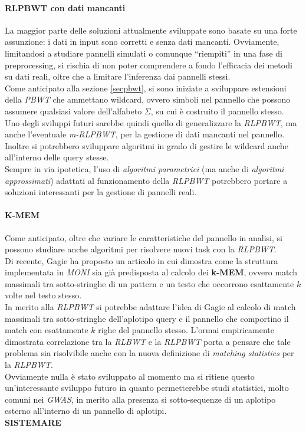 \paragraph{RLPBWT con dati mancanti}
La maggior parte delle soluzioni attualmente sviluppate sono basate su una forte
assunzione: i dati in input sono corretti e senza dati mancanti. Ovviamente,
limitandosi a studiare pannelli simulati o comunque ``riempiti'' in una fase di
preprocessing, si rischia di non poter comprendere a fondo l'efficacia dei
metodi su dati reali, oltre che a limitare l'inferenza dai pannelli stessi.\\
Come anticipato alla sezione \ref{secpbwt}, si sono iniziate a sviluppare
estensioni della \textit{PBWT} che ammettano wildcard, ovvero simboli nel
pannello che possono assumere qualsiasi valore dell'alfabeto $\Sigma$, su cui è
costruito il pannello stesso.\\
Uno degli sviluppi futuri sarebbe quindi quello di generalizzare la
\textit{RLPBWT}, ma anche l'eventuale \textit{m-RLPBWT}, per la gestione di dati
mancanti nel pannello. Inoltre si potrebbero sviluppare algoritmi in grado di
gestire le wildcard anche all'interno delle query stesse.\\
Sempre in via ipotetica, l'uso di \textit{algoritmi parametrici} (ma anche
di \textit{algoritmi approssimati}) adattati al
funzionamento della \textit{RLPBWT} potrebbero portare a soluzioni interessanti
per la gestione di pannelli reali.
\paragraph{K-MEM}
Come anticipato, oltre che variare le caratteristiche del pannello in analisi,
si possono studiare anche algoritmi per risolvere nuovi task con la
\textit{RLPBWT}.\\ 
Di recente, Gagie \cite{kmems} ha proposto un articolo in cui dimostra come
la struttura implementata in \textit{MONI} \cite{moni} sia già predisposta al
calcolo dei \textbf{k-MEM}, ovvero match massimali tra sotto-stringhe di un
pattern e un testo che occorrono esattamente $k$ volte nel testo stesso.\\
In merito alla \textit{RLPBWT} si potrebbe adattare l'idea di Gagie al calcolo
di match massimali tra sotto-stringhe dell'aplotipo query e il pannello che
comportino il match con esattamente $k$ righe del pannello stesso. L'ormai
empiricamente dimostrata correlazione tra la \textit{RLBWT} e la \textit{RLPBWT}
porta a pensare che tale problema sia risolvibile anche con la nuova definizione
di \textit{matching statistics} per la \textit{RLPBWT}.\\
Ovviamente nulla è stato sviluppato al momento ma si ritiene questo
un'interessante sviluppo futuro in quanto permetterebbe studi statistici, molto
comuni nei \textit{GWAS}, in merito alla presenza si sotto-sequenze di un
aplotipo esterno all'interno di un pannello di aplotipi.\\
\textbf{SISTEMARE}
